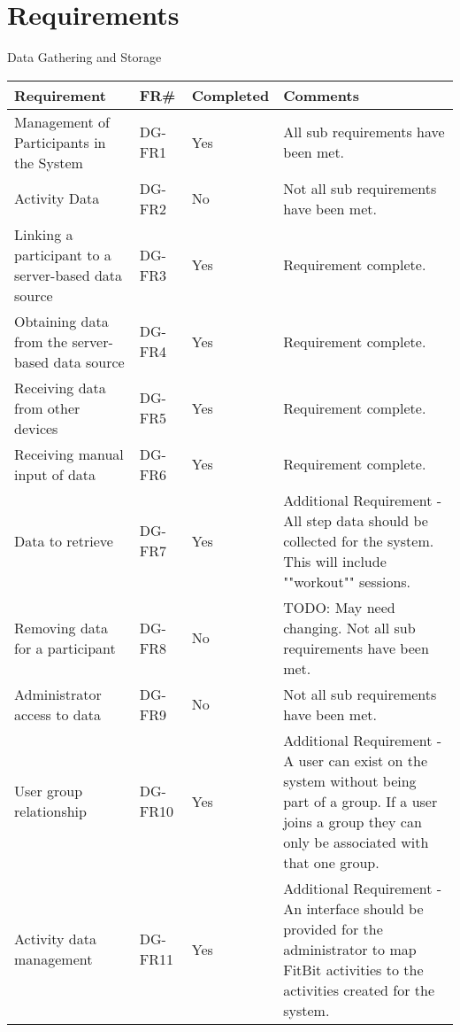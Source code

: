 \chapter{Requirements}


Data Gathering and Storage \\
\begin{center}
\begin{tabular}{ |l|l|l|l|}
\hline
Requirement	&	FR\#	&	Completed	&	Comments \\
\hline
Management of Participants in the System			& DG-FR1	& Yes	& All sub requirements have been met. \\
Activity Data										& DG-FR2	& No	& Not all sub requirements have been met. \\
Linking a participant to a server-based data source	& DG-FR3	& Yes	& Requirement complete. \\
Obtaining data from the server-based data source	& DG-FR4	& Yes	& Requirement complete. \\
Receiving data from other devices					& DG-FR5	& Yes	& Requirement complete. \\
Receiving manual input of data						& DG-FR6	& Yes	& Requirement complete. \\
Data to retrieve 									& DG-FR7	& Yes	& Additional Requirement - All step data should be collected for the system. This will include ""workout"" sessions. \\
Removing data for a participant						& DG-FR8	& No	& TODO: May need changing. Not all sub requirements have been met. \\
Administrator access to data						& DG-FR9	& No	& Not all sub requirements have been met. \\
User group relationship								& DG-FR10	& Yes	& Additional Requirement - A user can exist on the system without being part of  a group. If a user joins a group they can only be associated with that one group. \\
Activity data management							& DG-FR11	& Yes	& Additional Requirement - An interface should be provided for the administrator to map FitBit activities to the activities created for the system. \\

\hline
\end{tabular}
\end{center}

